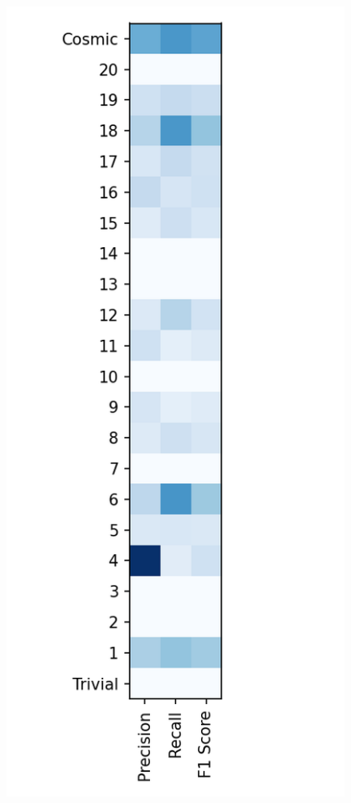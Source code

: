 \documentclass{article}
\begin{document}
	\begin{figure}[ht]
		\begin{minipage}[b]{0.32\linewidth}
			\centering
			\includegraphics[width=\linewidth]{22 - Multinomial Naive Bayes.png} 

\end{minipage}
\end{figure}
\end{document}
